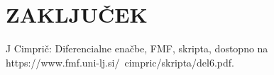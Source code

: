 \documentclass[a4paper,12pt]{article}
\begin{document}
\newpage

\section{\textsc{\large{ZAKLJUČEK}}}


\newpage	
\begin{thebibliography}{99}
	J Cimprič: Diferencialne enačbe, FMF, skripta, dostopno na https://www.fmf.uni-lj.si/~cimpric/skripta/del6.pdf.

\end{thebibliography}
\end{document}
